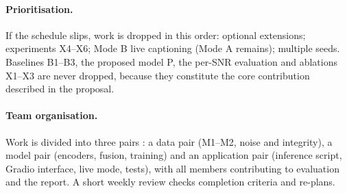 \paragraph{Prioritisation.} If the schedule slips, work is dropped in this order:
optional extensions; experiments X4--X6; Mode B live captioning (Mode A remains);
multiple seeds. Baselines B1--B3, the proposed model P, the per-SNR evaluation and
ablations X1--X3 are never dropped, because they constitute the core contribution
described in the proposal.

\paragraph{Team organisation.} Work is divided into three pairs \rec: a data pair
(M1--M2, noise and integrity), a model pair (encoders, fusion, training) and an
application pair (inference script, Gradio interface, live mode, tests), with all
members contributing to evaluation and the report. A short weekly review checks
completion criteria and re-plans.
